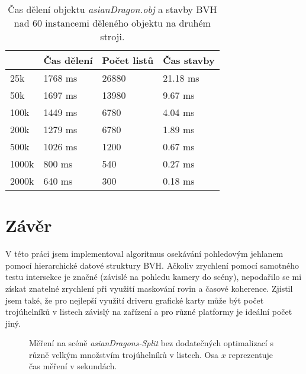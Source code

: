 \documentclass[report,11pt]{elsarticle}
\begin{document}
\begin{table}[]
\begin{center}
\begin{tabular}{l|lll}
      & Čas dělení & Počet listů & Čas stavby \\ \hline
25k   & 1768 ms    & 26880       & 21.18 ms   \\
50k   & 1697 ms    & 13980       & 9.67 ms   \\
100k  & 1449 ms    & 6780        & 4.04 ms   \\
200k  & 1279 ms    & 6780        & 1.89 ms   \\
500k  & 1026 ms    & 1200        & 0.67 ms    \\
1000k & 800 ms    & 540         & 0.27 ms    \\
2000k & 640 ms    & 300         & 0.18 ms
\end{tabular}
\end{center}
\caption{Čas dělení objektu \textit{asianDragon.obj} a stavby BVH nad 60 instancemi
děleného objektu na druhém stroji.}
\label{table:laptop:asianDragon}
\end{table}


\section{\label{SEC:Conclusion}Závěr}

V této práci jsem implementoval algoritmus osekávání pohledovým jehlanem pomocí
hierarchické datové struktury BVH. Ačkoliv zrychlení pomocí samotného testu
intersekce je značné (závislé na pohledu kamery do scény), nepodařilo se mi
získat znatelné zrychlení při využití maskování rovin a časové koherence. Zjistil
jsem také, že pro nejlepší využití driveru grafické karty může být počet
trojúhelníků v listech závislý na zařízení a pro různé platformy je ideální
počet jiný.



\begin{figure}
    \begin{center}
        
    \end{center}
    \caption{Měření na scéně \textit{asianDragons-Split} bez dodatečných optimalizací
             s různě velkým množstvím trojúhelníků v listech. Osa $x$ reprezentuje
             čas měření v sekundách.}
    \label{measure:NoOptim:asianDragons-Split}
\end{figure}
\end{document}
